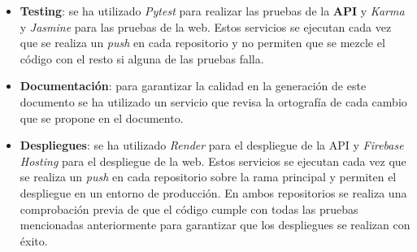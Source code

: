 \begin{itemize}
    \newpage

    \item \textbf{Testing}: se ha utilizado \textit{Pytest} para realizar las pruebas de la \textbf{API} y \textit{Karma} y
    \textit{Jasmine} para las pruebas de la web. Estos servicios se ejecutan cada vez que se realiza un
    \textit{push} en cada repositorio y no permiten que se mezcle el código con el resto si alguna de las pruebas falla.
    \item \textbf{Documentación}: para garantizar la calidad en la generación de este documento se ha utilizado un
    servicio que revisa la ortografía de cada cambio que se propone en el documento.
    \item \textbf{Despliegues}: se ha utilizado \textit{Render} para el despliegue de la API y \textit{Firebase Hosting} para
    el despliegue de la web. Estos servicios se ejecutan cada vez que se realiza un \textit{push} en cada repositorio
    sobre la rama principal y permiten el despliegue en un entorno de producción. En ambos repositorios se realiza
    una comprobación previa de que el código cumple con todas las pruebas mencionadas anteriormente para garantizar
    que los despliegues se realizan con éxito.
\end{itemize}

